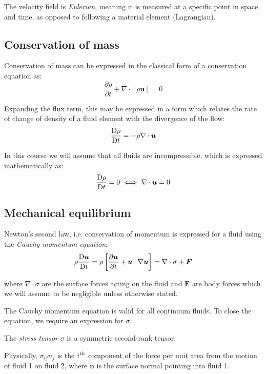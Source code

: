 \documentclass{jknotes}
\begin{document}
The velocity field is \emph{Eulerian}, meaning it is measured at a specific
point in space and time, as opposed to following a material element
(Lagrangian).

\subsection{Conservation of mass}

Conservation of mass can be expressed in the classical form of a conservation
equation as:
\begin{equation}
	\frac{\partial \rho}{\partial t} + \nabla \cdot \left[ \rho \bm{u} \right]
	= 0
\end{equation}

Expanding the flux term, this may be expressed in a form which relates the
rate of change of density of a fluid element with the divergence of the
flow:
\begin{equation}
	\frac{\mathrm{D}{\rho}}{\mathrm{D}{t}} = -\rho \nabla \cdot \bm{u}
\end{equation}

In this course we will assume that all fluids are incompressible, which is
expressed mathematically as:
\begin{equation}
	\frac{\mathrm{D}{\rho}}{\mathrm{D}{t}} = 0 \iff \nabla \cdot \bm{u} = 0
\end{equation}

\subsection{Mechanical equilibrium}
Newton's second law, i.e. conservation of momentum is expressed for a fluid
using the \emph{Cauchy momentum equation}:
\begin{equation}
	\rho \frac{\mathrm{D}{\bm{u}}}{\mathrm{D}{t}} = \rho \left[ \frac{\partial
	\bm{u}}{\partial t} + \bm{u} \cdot \nabla \bm{u}\right] = \nabla \cdot
	\sigma + \bm{F}
\end{equation}

where $\nabla \cdot \sigma$ are the surface forces acting on the fluid and
$\bm{F}$ are body forces which we will assume to be negligible unless
otherwise stated.
 
The Cauchy momentum equation is valid for all continuum fluids. To close the
equation, we require an expression for $\sigma$.

\begin{defn}
The \emph{stress tensor} $\sigma$ is a symmetric second-rank tensor.
\begin{center}
\end{center}
Physically, $\sigma_{ij}n_j$ is the $i\textsuperscript{th}$ component of the force per
unit area from the motion of fluid 1 on fluid 2, where $\bm{n}$ is the
surface normal pointing into fluid 1.
\end{defn}
\end{document}
